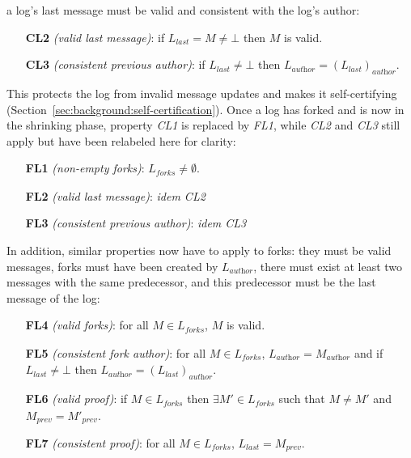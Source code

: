 \documentclass[9pt, oneside]{article}   	%
\newcommand{\logleadsto}{\overset{\textit{log}}\leadsto}
\begin{document}
a log's last message must be valid and consistent with the log's author:
\begin{tcolorbox}
\begin{enumerate}
	\item[\textbf{CL2}] \textit{(valid last message)}: if $L_\textit{last} = M \neq \bot$ then $M$ is valid.
	\item[\textbf{CL3}] \textit{(consistent previous author)}: if $L_\textit{last} \neq \bot$ then $L_\textit{author} = (L_\textit{last})_\textit{author}$.
\end{enumerate}
\end{tcolorbox}

This protects the log from invalid message updates and makes it self-certifying (Section~\ref{sec:background:self-certification}).  Once a log has forked and is now in the shrinking phase, property \textit{CL1} is replaced by \textit{FL1}, while \textit{CL2} and \textit{CL3} still apply but have been relabeled here for clarity:
\begin{tcolorbox}
\begin{enumerate}
	\item[\textbf{FL1}] \textit{(non-empty forks)}: $L_\textit{forks} \neq \emptyset$.
	\item[\textbf{FL2}] \textit{(valid last message)}: \textit{idem CL2}
	\item[\textbf{FL3}] \textit{(consistent previous author)}: \textit{idem CL3}
\end{enumerate}
\end{tcolorbox}


In addition, similar properties now have to apply to forks: they must be valid messages, forks must have been created by $L_\textit{author}$, there must exist at least two messages with the same predecessor, and this predecessor must be the last message of the log: 
\begin{tcolorbox}
\begin{enumerate}
	\item[\textbf{FL4}] \textit{(valid forks)}: for all $M \in L_\textit{forks}$, $M$ is valid.
	\item[\textbf{FL5}] \textit{(consistent fork author)}: for all $M \in L_\textit{forks}$, $L_\textit{author} = M_\textit{author}$ and if $L_\textit{last} \neq \bot$ then $L_\textit{author} = (L_\textit{last})_\textit{author}$.
	\item[\textbf{FL6}] \textit{(valid proof)}: if $M \in L_\textit{forks}$ then $\exists M' \in L_\textit{forks}$ such that $M \neq M'$ and $M_\textit{prev} = M'_\textit{prev}$.
	\item[\textbf{FL7}] \textit{(consistent proof)}:  for all $M \in L_\textit{forks}$, $L_\textit{last} = M_\textit{prev}$. %
\end{enumerate}
\end{tcolorbox}
\end{document}
